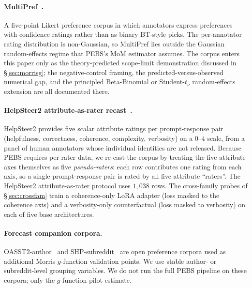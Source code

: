 \documentclass{article}
\begin{document}
\paragraph{MultiPref~\citep{miranda2024hybrid}.}
A five-point Likert preference corpus in which annotators express
preferences with confidence ratings rather than as binary
BT-style picks. The per-annotator rating
distribution is non-Gaussian, so MultiPref lies outside the
Gaussian random-effects regime that PEBS's MoM estimator
assumes. The corpus enters this paper only as the
theory-predicted scope-limit demonstration discussed in
\S\ref{sec:morrisg}; the negative-control framing, the
predicted-versus-observed numerical gap, and the principled
Beta-Binomial or Student-$t_\nu$ random-effects extension are
all documented there.

\paragraph{HelpSteer2 attribute-as-rater recast~\citep{wang2024helpsteer2}.}
HelpSteer2 provides five scalar attribute ratings per prompt-response
pair (helpfulness, correctness, coherence, complexity, verbosity) on
a $0$--$4$ scale, from a panel of human annotators whose individual
identities are not released. Because PEBS requires per-rater data,
we re-cast the corpus by treating the five attribute axes themselves
as five \emph{pseudo-raters}: each row contributes one rating from
each axis, so a single prompt-response pair is rated by all five
attribute ``raters''. The HelpSteer2 attribute-as-rater protocol uses
$1{,}038$ rows. The cross-family probes of \S\ref{sec:crossfam}
train a coherence-only LoRA adapter (loss masked to the coherence
axis) and a verbosity-only counterfactual (loss masked to verbosity)
on each of five base architectures.

\paragraph{Forecast companion corpora.}
OASST2-author~\citep{kopf2023openassistant} and
SHP-subreddit~\citep{ethayarajh2022understanding} are open
preference corpora used as additional Morris $g$-function validation
points. We use stable author- or subreddit-level grouping variables.
We do not run the full PEBS pipeline on these corpora; only the
$g$-function pilot estimate.
\end{document}
